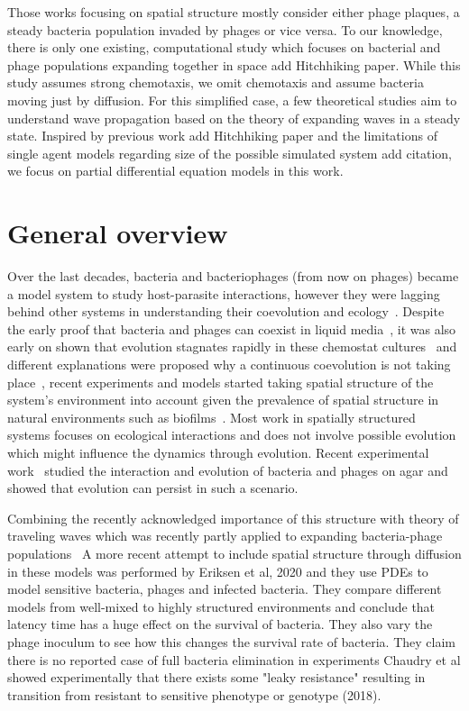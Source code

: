 Those works focusing on spatial structure mostly consider either phage plaques, a steady bacteria population invaded by phages or vice versa. To our knowledge, there is only one existing, computational study which focuses on bacterial and phage populations expanding together in space {\color{red} add Hitchhiking paper}. While this study assumes strong chemotaxis, we omit chemotaxis and assume bacteria moving just by diffusion. For this simplified case, a few theoretical studies aim to understand wave propagation based on the theory of expanding waves in a steady state. 
Inspired by previous work {\color{red} add Hitchhiking paper} and the limitations of single agent models regarding size of the possible simulated system {\color{red} add citation}, we focus on partial differential equation models in this work.

\section{General overview}

Over the last decades, bacteria and bacteriophages (from now on phages) became a model system to study host-parasite interactions, however they were lagging behind other systems in understanding their coevolution and ecology~\cite{Koskella2014}.
Despite the early proof that bacteria and phages can coexist in liquid media~\cite{Chao1977}, it was also early on shown that evolution stagnates rapidly in these chemostat cultures~\cite{Lenski1985} and different explanations were proposed why a continuous coevolution is not taking place~\cite{Lenski1984}, recent experiments and models started taking spatial structure of the system's environment into account given the prevalence of spatial structure in natural environments such as biofilms~\cite{Krysiak-Baltyn2016-xi, Gourley2004-rx}. Most work in spatially structured systems focuses on ecological interactions and does not involve possible evolution which might influence the dynamics through evolution. Recent experimental work~\cite{ShaerTamar2022} studied the interaction and evolution of bacteria and phages on agar and showed that evolution can persist in such a scenario.

Combining the recently acknowledged importance of this structure with theory of traveling waves which was recently partly applied to expanding bacteria-phage populations~\cite{Wang2024, Claydon2021}
A more recent attempt to include spatial structure through diffusion in these models was performed by Eriksen et al, 2020 and they use PDEs to model sensitive bacteria, phages and infected bacteria. They compare different models from well-mixed to highly structured environments and conclude that latency time has a huge effect on the survival of bacteria. They also vary the phage inoculum to see how this changes the survival rate of bacteria.
They claim there is no reported case of full bacteria elimination in experiments
Chaudry et al showed experimentally that there exists some "leaky resistance" resulting in transition from resistant to sensitive phenotype or genotype (2018).

